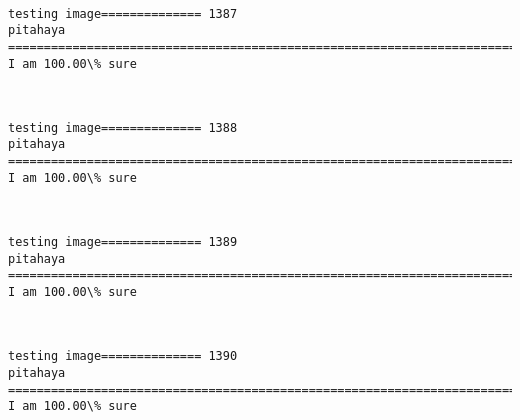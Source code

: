 \documentclass[11pt]{article}
\begin{document}
    \begin{center}
    \end{center}
    { \hspace*{\fill} \\}
    
    \begin{Verbatim}[commandchars=\\\{\}]
testing image============== 1387
pitahaya
============================================================================
I am 100.00\% sure

    \end{Verbatim}

    \begin{center}
    \end{center}
    { \hspace*{\fill} \\}
    
    \begin{Verbatim}[commandchars=\\\{\}]
testing image============== 1388
pitahaya
============================================================================
I am 100.00\% sure

    \end{Verbatim}

    \begin{center}
    \end{center}
    { \hspace*{\fill} \\}
    
    \begin{Verbatim}[commandchars=\\\{\}]
testing image============== 1389
pitahaya
============================================================================
I am 100.00\% sure

    \end{Verbatim}

    \begin{center}
    \end{center}
    { \hspace*{\fill} \\}
    
    \begin{Verbatim}[commandchars=\\\{\}]
testing image============== 1390
pitahaya
============================================================================
I am 100.00\% sure

    \end{Verbatim}
\end{document}
